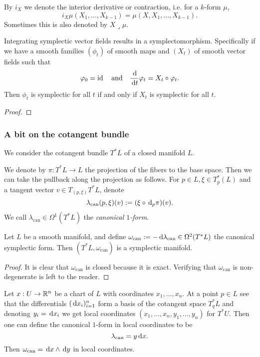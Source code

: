 \begin{remark}
    By $i_X$ we denote the interior derivative or contraction, i.e. for a $k$-form $\mu$,
    \[i_X\mu(X_1,\ldots,X_{k-1})=\mu(X,X_1,\ldots,X_{k-1}).\]
    Sometimes this is also denoted by $X\lrcorner \mu$.
\end{remark}

\begin{prop}
    Integrating symplectic vector fields results in a symplectomorphism.
    Specifically if we have a smooth families $(\phi_t)$ of smooth maps and $(X_t)$ of smooth vector fields such that
    \[\varphi_0=\operatorname{id}\quad\text{and}\quad\frac{\,\mathrm d}{\,\mathrm d t}\varphi_t=X_t\circ\varphi_t.\]
    Then $\phi_t$ is symplectic for all $t$ if and only if $X_t$ is symplectic for all $t$.
\end{prop}

\begin{proof}
\end{proof}

\subsubsection*{A bit on the cotangent bundle}
We consider the cotangent bundle $T^*L$ of a closed manifold $L$.
\begin{dfn}
    We denote by $\pi:T^*L\to L$ the projection of the fibers to the base space.
    Then we can take the pullback along the projection as follows.
    For $p\in L,\xi\in T^*_p(L)$ and a tangent vector $v\in T_{(p,\xi)}T^*L$, denote
    \[\lambda_{\mathrm{can}}(p,\xi)(v):=(\xi\circ\,\mathrm d_p\pi)(v).\]
    We call $\lambda_{\mathrm{can}}\in\Omega^1(T^*L)$ the \emph{canonical $1$-form}.
\end{dfn}

\begin{prop}
    Let $L$ be a smooth manifold, and define $\omega_{\mathrm{can}}:=-\,\mathrm d\lambda_{\mathrm{can}}\in\Omega^2(T^*L)$ the canonical symplectic form.
    Then $(T^*L,\omega_{\mathrm{can}})$ is a symplectic manifold.
\end{prop}

\begin{proof}
    It is clear that $\omega_{\mathrm{can}}$ is closed because it is exact.
    Verifying that $\omega_{\mathrm{can}}$ is non-degenerate is left to the reader.
\end{proof}

\begin{remark}
    Let $x:U\to\mathbb{R}^n$ be a chart of $L$ with coordinates $x_1,\ldots,x_n$.
    At a point $p\in L$ see that the differentials $(\,\mathrm d x_i)_{i=1}^n$ form a basis of the cotangent space $T_q^*L$ and denoting $y_i=\,\mathrm d x_i$ we get local coordinates $(x_1,\ldots,x_n,y_1,\ldots,y_n)$ for $T^*U$.
    Then one can define the canonical $1$-form in local coordinates to be
    \[\lambda_{\mathrm{can}}=y\,\mathrm d x.\]
    Then $\omega_{\mathrm{can}}=\,\mathrm d x\wedge\,\mathrm d y$ in local coordinates.
\end{remark}

